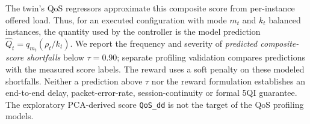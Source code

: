 The twin's QoS regressors approximate this composite score from per-instance
offered load. Thus, for an executed configuration with mode $m_t$ and $k_t$
balanced instances, the quantity used by the controller is the model prediction
$\widehat Q_t=q_{m_t}(\rho_t/k_t)$. We report the frequency and severity of
\emph{predicted composite-score shortfalls} below $\tau=0.90$; separate profiling
validation compares predictions with the measured score labels. The reward uses
a soft penalty on these modeled shortfalls. Neither a prediction above $\tau$
nor the reward formulation establishes an end-to-end delay, packet-error-rate,
session-continuity or formal 5QI guarantee. The exploratory PCA-derived score
\texttt{QoS\_dd} is not the target of the QoS profiling models.


